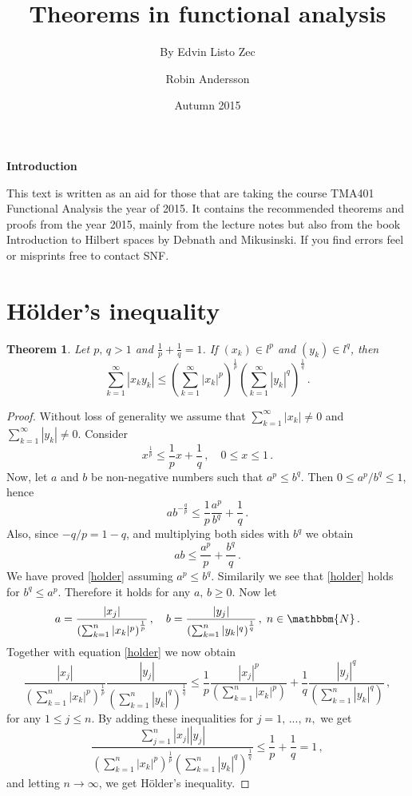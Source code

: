 \documentclass[12pt, a4paper]{article}
\title{Theorems in functional analysis}
\author{By Edvin Listo Zec  \and  Robin Andersson}
\date{Autumn 2015}
\newcommand{\N}{\ensuremath{\mathbbm{N}}}
\newtheorem{theorem}{Theorem}[section]
\begin{document}
\maketitle
{}
\thispagestyle{empty}
\centerline{\textbf{Introduction}}
\noindent This text is written as an aid for those that are taking the course TMA401 Functional Analysis the year of 2015. It contains the recommended theorems and proofs from the year 2015, mainly from the lecture notes but also from the book Introduction to Hilbert spaces by Debnath and Mikusinski. If you find errors feel or misprints free to contact SNF.

\newpage
\tableofcontents
\thispagestyle{empty}
\newpage
\setcounter{page}{1}

\section{Hölder's inequality}
\begin{theorem}
Let $p,\,q>1$ and $\frac{1}{p}+\frac{1}{q}=1$. If $(x_k)\in l^p$ and $(y_k)\in l^q$, then
\[
    \sum_{k=1}^\infty|x_ky_k|\leq \left(\sum_{k=1}^\infty|x_k|^p\right)^\frac{1}{p}\left(\sum_{k=1}^\infty|y_k|^q\right)^\frac{1}{q}\,.
\]
\end{theorem}
\begin{proof}
Without loss of generality we assume that $\sum_{k=1}^\infty |x_k|\neq 0$ and $\sum_{k=1}^\infty|y_k|\neq 0$. Consider
\[
    x^\frac{1}{p}\leq\dfrac{1}{p}x+\dfrac{1}{q}\,,\quad 0\leq x \leq 1\,.
\]
Now, let $a$ and $b$ be non-negative numbers such that $a^p\leq b^q$. Then $0\leq a^p/b^q\leq 1$, hence
\[
    ab^{-\frac{q}{p}}\leq\dfrac{1}{p}\dfrac{a^p}{b^q}+\dfrac{1}{q}\,.
\]
Also, since $-q/p=1-q$, and multiplying both sides with $b^q$ we obtain
\begin{equation}
\label{holder}
ab\leq \dfrac{a^p}{p}+\dfrac{b^q}{q}\,.
\end{equation}
We have proved \eqref{holder} assuming $a^p\leq b^q$. Similarily we see that \eqref{holder} holds for $b^q\leq a^p$. Therefore it holds for any $a,\,b\geq 0$. Now let
\[
    a=\dfrac{|x_j|}{\left(\sum_{k=1}^n|x_k|^p \right)^\frac{1}{p}}\,,\quad  b=\dfrac{|y_j|}{\left(\sum_{k=1}^n|y_k|^q \right)^\frac{1}{q}}\,,\;n\in\N\,.
\]
Together with equation \eqref{holder} we now obtain
\[
    \dfrac{|x_j|}{\left(\sum_{k=1}^n|x_k|^p \right)^\frac{1}{p}}\dfrac{|y_j|}{\left(\sum_{k=1}^n|y_k|^q \right)^\frac{1}{q}}\leq \dfrac{1}{p}\dfrac{|x_j|^p}{\left(\sum_{k=1}^n|x_k|^p \right)}+\dfrac{1}{q}\dfrac{|y_j|^q}{\left(\sum_{k=1}^n|y_k|^q \right)}\,,
\]
for any $1\leq j\leq n$. By adding these inequalities for $j=1,\,...,\,n,$ we get
\[
    \dfrac{\sum_{j=1}^n|x_j||y_j|}{\left(\sum_{k=1}^n|x_k|^p \right)^\frac{1}{p}\left(\sum_{k=1}^n|y_k|^q \right)^\frac{1}{q}}\leq\dfrac{1}{p}+\dfrac{1}{q}=1\,,
\]
and letting $n\to\infty$, we get Hölder's inequality.
\end{proof}
\end{document}
